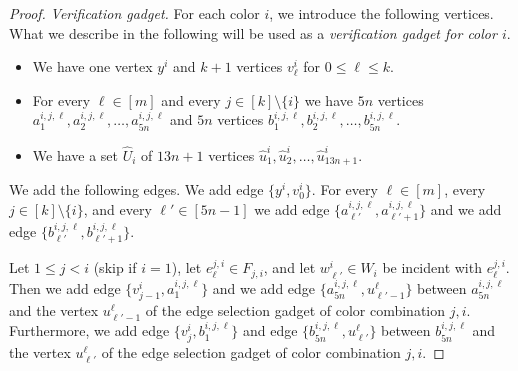 \documentclass[a4paper,UKenglish,cleveref, autoref, thm-restate]{lipics-v2021}
\begin{document}
\begin{proof}
    
    \emph{Verification gadget.} For each color $i$, we introduce the following vertices. What we describe in the following will be used as a \emph{verification gadget for color $i$}.
    \begin{itemize}
        \item We have one vertex $y^i$ and $k+1$ vertices $v^i_\ell$ for $0\le \ell\le k$.
        \item For every $\ell\in[m]$ and every $j\in[k]\setminus\{i\}$ we have $5n$ vertices $a^{i,j,\ell}_1,a^{i,j,\ell}_2,\ldots,a^{i,j,\ell}_{5n}$ and $5n$ vertices $b^{i,j,\ell}_1,b^{i,j,\ell}_2,\ldots,b^{i,j,\ell}_{5n}$.
        \item We have a set $\hat{U}_i$ of $13n+1$ vertices $\hat{u}^i_1,\hat{u}^i_2,\ldots,\hat{u}^i_{13n+1}$.
    \end{itemize}
    We add the following edges. We add edge $\{y^i,v^i_0\}$.
    For every $\ell\in[m]$, every $j\in[k]\setminus\{i\}$, and every $\ell'\in[5n-1]$ we add edge $\{a^{i,j,\ell}_{\ell'},a^{i,j,\ell}_{\ell'+1}\}$ and we add edge $\{b^{i,j,\ell}_{\ell'},b^{i,j,\ell}_{\ell'+1}\}$.
    
    Let $1\le j<i$ (skip if $i=1$), let $e_\ell^{j,i}\in F_{j,i}$, and let $w^i_{\ell'}\in W_i$ be incident with $e_\ell^{j,i}$. Then we add edge $\{v_{j-1}^i,a^{i,j,\ell}_{1}\}$ and we add edge $\{a^{i,j,\ell}_{5n},u^\ell_{\ell'-1}\}$ between $a^{i,j,\ell}_{5n}$ and the vertex $u^\ell_{\ell'-1}$ of the edge selection gadget of color combination $j,i$.
    Furthermore, we add edge $\{v_{j}^i,b^{i,j,\ell}_{1}\}$ and edge $\{b^{i,j,\ell}_{5n},u^\ell_{\ell'}\}$ between $b^{i,j,\ell}_{5n}$ and the vertex $u^\ell_{\ell'}$ of the edge selection gadget of color combination $j,i$.


\end{proof}
\end{document}
